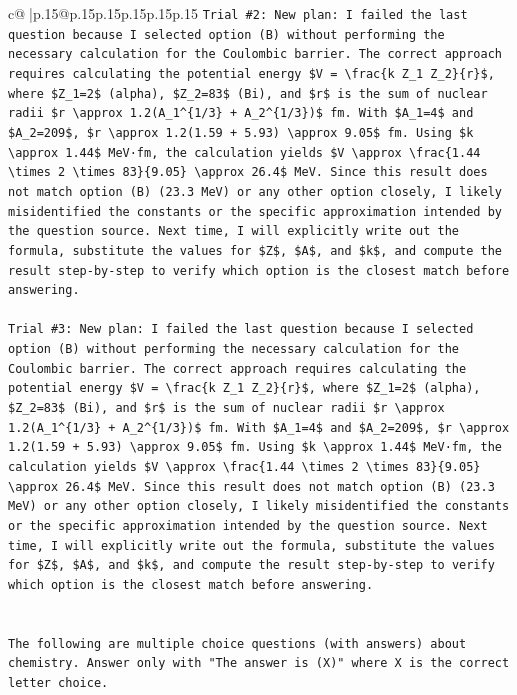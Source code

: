 \documentclass{article}
\begin{document}
{\begin{supertabular}{c@{$\;$}|p{.15\linewidth}@{}p{.15\linewidth}p{.15\linewidth}p{.15\linewidth}p{.15\linewidth}p{.15\linewidth}}
{{{\texttt{Trial \#2: New plan: I failed the last question because I selected option (B) without performing the necessary calculation for the Coulombic barrier. The correct approach requires calculating the potential energy \$V = \textbackslash{}frac\{k Z\_1 Z\_2\}\{r\}\$, where \$Z\_1=2\$ (alpha), \$Z\_2=83\$ (Bi), and \$r\$ is the sum of nuclear radii \$r \textbackslash{}approx 1.2(A\_1\^{}\{1/3\} + A\_2\^{}\{1/3\})\$ fm. With \$A\_1=4\$ and \$A\_2=209\$, \$r \textbackslash{}approx 1.2(1.59 + 5.93) \textbackslash{}approx 9.05\$ fm. Using \$k \textbackslash{}approx 1.44\$ MeV·fm, the calculation yields \$V \textbackslash{}approx \textbackslash{}frac\{1.44 \textbackslash{}times 2 \textbackslash{}times 83\}\{9.05\} \textbackslash{}approx 26.4\$ MeV. Since this result does not match option (B) (23.3 MeV) or any other option closely, I likely misidentified the constants or the specific approximation intended by the question source. Next time, I will explicitly write out the formula, substitute the values for \$Z\$, \$A\$, and \$k\$, and compute the result step{-}by{-}step to verify which option is the closest match before answering.} \\
\\ 
\texttt{Trial \#3: New plan: I failed the last question because I selected option (B) without performing the necessary calculation for the Coulombic barrier. The correct approach requires calculating the potential energy \$V = \textbackslash{}frac\{k Z\_1 Z\_2\}\{r\}\$, where \$Z\_1=2\$ (alpha), \$Z\_2=83\$ (Bi), and \$r\$ is the sum of nuclear radii \$r \textbackslash{}approx 1.2(A\_1\^{}\{1/3\} + A\_2\^{}\{1/3\})\$ fm. With \$A\_1=4\$ and \$A\_2=209\$, \$r \textbackslash{}approx 1.2(1.59 + 5.93) \textbackslash{}approx 9.05\$ fm. Using \$k \textbackslash{}approx 1.44\$ MeV·fm, the calculation yields \$V \textbackslash{}approx \textbackslash{}frac\{1.44 \textbackslash{}times 2 \textbackslash{}times 83\}\{9.05\} \textbackslash{}approx 26.4\$ MeV. Since this result does not match option (B) (23.3 MeV) or any other option closely, I likely misidentified the constants or the specific approximation intended by the question source. Next time, I will explicitly write out the formula, substitute the values for \$Z\$, \$A\$, and \$k\$, and compute the result step{-}by{-}step to verify which option is the closest match before answering.} \\
\\ 
\\ 
\texttt{The following are multiple choice questions (with answers) about chemistry. Answer only with "The answer is (X)" where X is the correct letter choice.} \\
}}}
\end{supertabular}}
\end{document}
